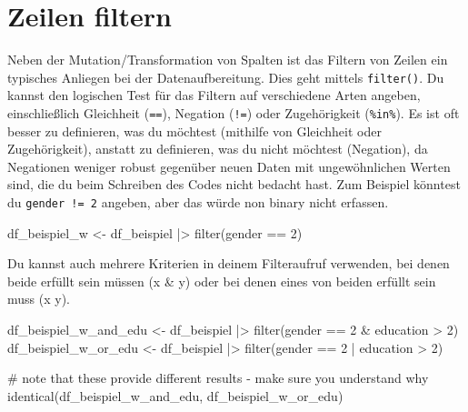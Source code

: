 \documentclass[
  letterpaper,
  DIV=11,
  numbers=noendperiod]{scrreprt}
\newenvironment{Shaded}{\begin{snugshade}}{\end{snugshade}}
\newcommand{\CommentTok}[1]{\textcolor[rgb]{0.37,0.37,0.37}{#1}}
\newcommand{\DecValTok}[1]{\textcolor[rgb]{0.68,0.00,0.00}{#1}}
\newcommand{\FunctionTok}[1]{\textcolor[rgb]{0.28,0.35,0.67}{#1}}
\newcommand{\NormalTok}[1]{\textcolor[rgb]{0.00,0.23,0.31}{#1}}
\newcommand{\OtherTok}[1]{\textcolor[rgb]{0.00,0.23,0.31}{#1}}
\newcommand{\SpecialCharTok}[1]{\textcolor[rgb]{0.37,0.37,0.37}{#1}}
\begin{document}
\chapter{Zeilen filtern}\label{zeilen-filtern}

Neben der Mutation/Transformation von Spalten ist das Filtern von Zeilen
ein typisches Anliegen bei der Datenaufbereitung. Dies geht mittels
\texttt{filter()}. Du kannst den logischen Test für das Filtern auf
verschiedene Arten angeben, einschließlich Gleichheit (\texttt{==}),
Negation (\texttt{!=}) oder Zugehörigkeit (\texttt{\%in\%}). Es ist oft
besser zu definieren, was du möchtest (mithilfe von Gleichheit oder
Zugehörigkeit), anstatt zu definieren, was du nicht möchtest (Negation),
da Negationen weniger robust gegenüber neuen Daten mit ungewöhnlichen
Werten sind, die du beim Schreiben des Codes nicht bedacht hast. Zum
Beispiel könntest du \texttt{gender\ !=\ 2} angeben, aber das würde non
binary nicht erfassen.

\begin{Shaded}
\begin{Highlighting}[]
\NormalTok{df\_beispiel\_w }\OtherTok{\textless{}{-}}\NormalTok{ df\_beispiel }\SpecialCharTok{|\textgreater{}} \FunctionTok{filter}\NormalTok{(gender }\SpecialCharTok{==} \DecValTok{2}\NormalTok{)}
\end{Highlighting}
\end{Shaded}

Du kannst auch mehrere Kriterien in deinem Filteraufruf verwenden, bei
denen beide erfüllt sein müssen (x \& y) oder bei denen eines von beiden
erfüllt sein muss (x \textbar{} y).

\begin{Shaded}
\begin{Highlighting}[]
\NormalTok{df\_beispiel\_w\_and\_edu }\OtherTok{\textless{}{-}}\NormalTok{ df\_beispiel }\SpecialCharTok{|\textgreater{}} \FunctionTok{filter}\NormalTok{(gender }\SpecialCharTok{==} \DecValTok{2} \SpecialCharTok{\&}\NormalTok{ education }\SpecialCharTok{\textgreater{}} \DecValTok{2}\NormalTok{)}
\NormalTok{df\_beispiel\_w\_or\_edu }\OtherTok{\textless{}{-}}\NormalTok{ df\_beispiel }\SpecialCharTok{|\textgreater{}} \FunctionTok{filter}\NormalTok{(gender }\SpecialCharTok{==} \DecValTok{2} \SpecialCharTok{|}\NormalTok{ education }\SpecialCharTok{\textgreater{}} \DecValTok{2}\NormalTok{)}


\CommentTok{\# note that these provide different results {-} make sure you understand why}
\FunctionTok{identical}\NormalTok{(df\_beispiel\_w\_and\_edu, df\_beispiel\_w\_or\_edu)}
\end{Highlighting}
\end{Shaded}
\end{document}
